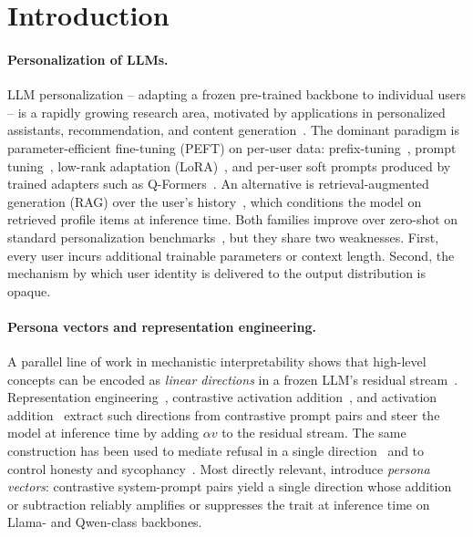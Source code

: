 \documentclass{article}
\begin{document}
\section{Introduction}
\label{sec:intro}

\paragraph{Personalization of LLMs.}
LLM personalization -- adapting a frozen pre-trained backbone to
individual users -- is a rapidly growing research area, motivated by
applications in personalized assistants, recommendation, and content
generation~\cite{salemi2024lamp,kumar2024longlamp}. The dominant
paradigm is parameter-efficient fine-tuning (PEFT) on per-user data:
prefix-tuning~\cite{li2021prefix}, prompt
tuning~\cite{lester2021prompt}, low-rank adaptation
(LoRA)~\cite{hu2022lora}, and per-user soft prompts produced by
trained adapters such as Q-Formers~\cite{li2023blip2,hebert2024persoma}.
An alternative is retrieval-augmented generation (RAG) over the user's
history~\cite{salemi2024lamp,salemi2024optimization,
salemi2024comparing,shi2024collaborative,
amirizaniani2025multistep}, which conditions the model on retrieved
profile items at inference time. Both families improve over zero-shot
on standard personalization
benchmarks~\cite{salemi2024lamp,kumar2024longlamp}, but they share two
weaknesses. First, every user incurs additional trainable parameters
or context length. Second, the mechanism by which user identity is
delivered to the output distribution is opaque.

\paragraph{Persona vectors and representation engineering.}
A parallel line of work in mechanistic interpretability shows that
high-level concepts can be encoded as \emph{linear directions} in a
frozen LLM's residual stream~\cite{elhage2021framework,
park2024linear,zou2023repe}. Representation
engineering~\cite{zou2023repe}, contrastive activation
addition~\cite{rimsky2024caa}, and activation
addition~\cite{turner2023actadd,subramani2022extracting} extract such
directions from contrastive prompt pairs and steer the model at
inference time by adding $\alpha v$ to the residual stream. The same
construction has been used to mediate refusal in a single
direction~\cite{arditi2024refusal} and to control honesty and
sycophancy~\cite{rimsky2024caa,zou2023repe}. Most directly relevant,
\citet{chen2025persona} introduce \emph{persona vectors}: contrastive
system-prompt pairs yield a single direction whose addition or
subtraction reliably amplifies or suppresses the trait at inference
time on Llama- and Qwen-class backbones.
\end{document}
